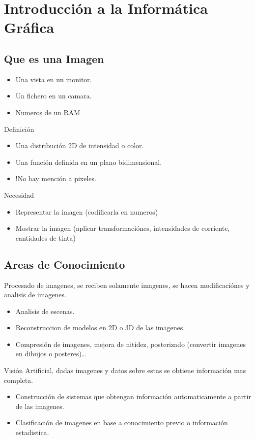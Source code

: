 \documentclass[12pt, twoside, openright]{report} %
\begin{document}
\chapter{Introducción a la Informática Gráfica}\label{ch:introduccion-a-la-informática-gráfica}
  \section{Que es una Imagen}
\begin{itemize}
  \item Una vista en un monitor.
  \item Un fichero en un camara.
  \item Numeros de un RAM
\end{itemize}
  Definición
\begin{itemize}
  \item Una distribución 2D de intensidad o color.
  \item Una función definida en un plano bidimensional.
  \item !No hay mención a pixeles.
\end{itemize}
Necesidad
\begin{itemize}
  \item Representar la imagen (codificarla en numeros)
  \item Mostrar la imagen (aplicar transformaciónes, intensidades de corriente, cantidades de tinta)
\end{itemize}

  \section{Areas de Conocimiento}
  Procesado de imagenes, se reciben solamente imagenes, se hacen modificaciónes y analisis de imagenes.
\begin{itemize}
  \item Analisis de escenas.
  \item Reconstruccion de modelos en 2D o 3D de las imagenes.
  \item Compresión de imagenes, mejora de nitidez, posterizado (convertir imagenes en dibujos o posteres)\ldots
\end{itemize}

  Visión Artificial, dadas imagenes y datos sobre estas se obtiene información mas completa.
\begin{itemize}
  \item Construcción de sistemas que obtengan información automaticamente a partir de las imagenes.
  \item Clasificación de imagenes en base a conocimiento previo o información estadistica.
\end{itemize}
\end{document}

